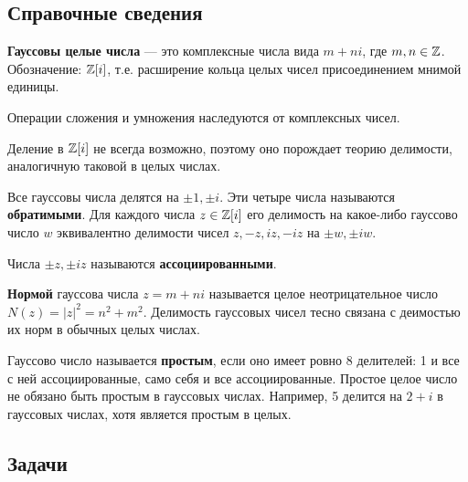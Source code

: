 \subsection*{Справочные сведения}

\textbf{Гауссовы целые числа} --- это комплексные числа вида $m+ni$, где $m,n\in\mathbb Z$. Обозначение: $\mathbb Z[i]$, т.е. расширение кольца целых чисел присоединением мнимой единицы.

Операции сложения и умножения наследуются от комплексных чисел.

Деление в $\mathbb Z[i]$ не всегда возможно, поэтому оно порождает теорию делимости, аналогичную таковой в целых числах.

Все гауссовы числа делятся на $\pm 1, \pm i$. Эти четыре числа называются \textbf{обратимыми}. Для каждого числа $z\in\mathbb Z[i]$ его делимость на какое-либо гауссово число $w$ эквивалентно делимости чисел $z,-z,iz,-iz$ на $\pm w,\pm iw$. 

Числа $\pm z, \pm iz$ называются \textbf{ассоциированными}.

\textbf{Нормой} гауссова числа $z=m+ni$ называется целое неотрицательное число $N(z)=|z|^2=n^2+m^2$. Делимость гауссовых чисел тесно связана с деимостью их норм в обычных целых числах.

Гауссово число называется \textbf{простым}, если оно имеет ровно 8 делителей: 1 и все с ней ассоциированные, само себя и все ассоциированные. Простое целое число не обязано быть простым в гауссовых числах. Например, 5 делится на $2+i$ в гауссовых числах, хотя является простым в целых.




\subsection*{Задачи}



